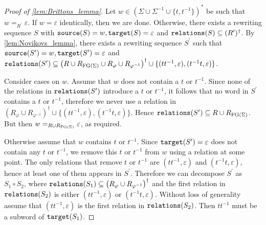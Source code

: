 \begin{proof}[Proof of \cref{lem:Brittons_lemma}]
  Let $w\in (\Sigma \cup \Sigma^{-1} \cup \{t, t^{-1}\})^\ast$ be such that
  $w =_{R^\prime} \varepsilon$. If $w = \varepsilon$ identically, then we are done.
  Otherwise, there exists a rewriting sequence $S$ with $\texttt{source}(S) = w, \texttt{target}(S) =
  \varepsilon$ and $\texttt{relations}(S) \subseteq (R^\prime)^\dagger$.
  By \cref{lem:Novikovs_lemma}, there exists a rewriting sequence $S^\prime$
  such that $\texttt{source}(S^\prime) = w, \texttt{target}(S^\prime) = \varepsilon$ and
  $\texttt{relations}(S^\prime) \subseteq \left(R\cup R_{\textrm{FG}(\Sigma)} \cup R_\varphi \cup
  R_{\varphi^{-1}}\right)^\dagger \cup \{(tt^{-1}, \varepsilon), (t^{-1}t, \varepsilon)\}$.

  Consider cases on $w$. Assume that $w$ does not contain a $t$ or $t^{-1}$. Since none of the
  relations in $\texttt{relations}(S^\prime)$ introduce a $t$ or $t^{-1}$, it follows that no word in
  $S^\prime$ contains a $t$ or $t^{-1}$, therefore we never use a relation in
  $\left(R_\varphi \cup R_{\varphi^{-1}}\right)^\dagger \cup \{(tt^{-1}, \varepsilon), (t^{-1}t,
  \varepsilon)\}$. Hence $\texttt{relations}(S^\prime)\subseteq R\cup R_{\textrm{FG}(\Sigma)}$. But then $w
  =_{R\cup R_{\textrm{FG}(\Sigma)}} \varepsilon$, as required.

  Otherwise assume that $w$ contains $t$ or $t^{-1}$. Since $\texttt{target}(S^\prime) = \varepsilon$
  does not contain any $t$ or $t^{-1}$, we remove this $t$ or $t^{-1}$ from $w$ using a relation
  at some point. The only relations that remove $t$ or $t^{-1}$ are $(tt^{-1}, \varepsilon)$ and
  $(t^{-1}t, \varepsilon)$, hence at least one of them appears in $S^\prime$. Therefore we can
  decompose $S^\prime$ as $S_1 \circ S_2$, where
  $\texttt{relations}(S_1) \subseteq \left(R_\varphi \cup R_{\varphi^{-1}}\right)^\dagger$
  and the first relation in $\texttt{relations}(S_2)$ is either $(tt^{-1}, \varepsilon)$ or $(t^{-1}t,
  \varepsilon)$. Without loss of generality assume that $(tt^{-1}, \varepsilon)$ is the first
  relation in $\texttt{relations}(S_2)$.
  Then $tt^{-1}$ must be a subword of $\texttt{target}(S_1)$.


\end{proof}
